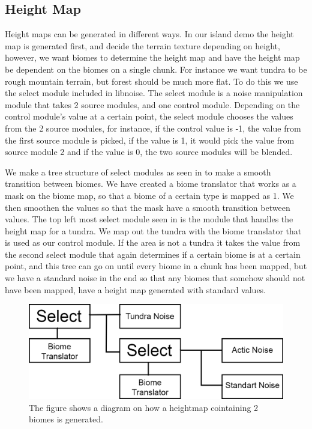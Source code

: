 \subsection{Height Map}

Height maps can be generated in different ways. In our island demo the height map is generated first, and decide the terrain texture depending on height, however, we want biomes to determine the height map and have the height map be dependent on the biomes on a single chunk. For instance we want tundra to be rough mountain terrain, but forest should be much more flat. To do this we use the select module included in libnoise. The select module is a noise manipulation module that takes 2 source modules, and one control module. Depending on the control module's value at a certain point, the select module chooses the values from the 2 source modules, for instance, if the control value is -1, the value from the first source module is picked, if the value is 1, it would pick the value from source module 2 and if the value is 0, the two source modules will be blended.

We make a tree structure of select modules as seen in  to make a smooth transition between biomes. We have created a biome translator that works as a mask on the biome map, so that a biome of a certain type is mapped as 1. We then smoothen the values so that the mask have a smooth transition between values. The top left most select module seen in  is the module that handles the height map for a tundra. We map out the tundra with the biome translator that is used as our control module. If the area is not a tundra it takes the value from the second select module that again determines if a certain biome is at a certain point, and this tree can go on until every biome in a chunk has been mapped, but we have a standard noise in the end so that any biomes that somehow should not have been mapped, have a height map generated with standard values.

\begin{figure}[H]
	\includegraphics[width=1\linewidth]{img/HeightMap}
	\centering
	\caption{The figure shows a diagram on how a heightmap cointaining 2 biomes is generated.}
	\label{fig:heightmap}
\end{figure}

